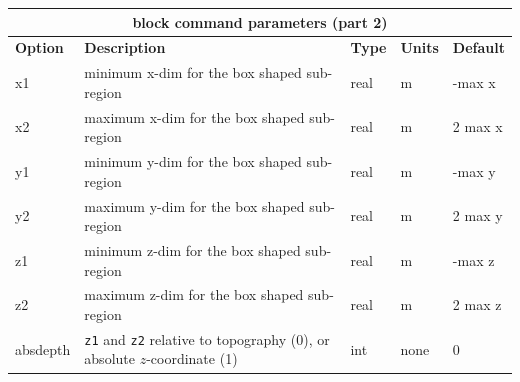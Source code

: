 \documentclass[11pt]{report}
\begin{document}
\begin{center}
\begin{tabular}{|l|p{8cm}|l|l|l|} \hline
\multicolumn{5}{|c|}{\bf block command parameters (part 2)}\\ \hline
{\bf Option} & {\bf Description}          & {\bf Type} & {\bf Units} & {\bf Default} \\ \hline 
\hline
x1          & minimum x-dim for the box shaped sub-region & real & m & -max x \\ \hline
x2          & maximum x-dim for the box shaped sub-region & real & m & 2 max x \\ \hline
\hline
y1          & minimum y-dim for the box shaped sub-region & real & m & -max y \\ \hline
y2          & maximum y-dim for the box shaped sub-region & real & m & 2 max y \\ \hline
\hline
z1          & minimum z-dim for the box shaped sub-region & real & m & -max z \\ \hline
z2          & maximum z-dim for the box shaped sub-region & real & m & 2 max z \\ \hline
\hline
absdepth    & {\tt z1} and {\tt z2} relative to topography (0), or absolute $z$-coordinate (1) & int
& none & 0 \\ \hline 
\end{tabular}
\end{center}
%

\end{document}
